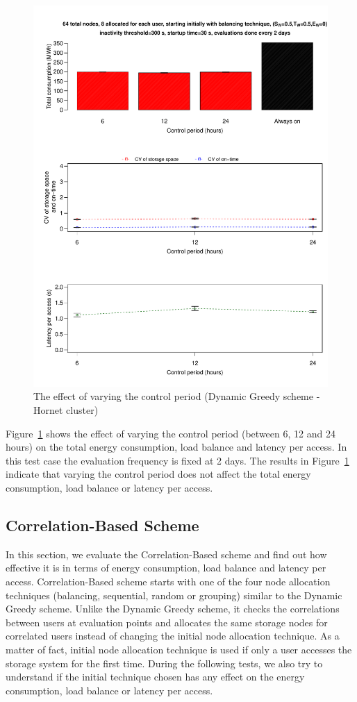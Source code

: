 \begin{figure}[!htbp]
\centering
\includegraphics[width=\columnwidth,keepaspectratio]{FIG11.pdf}
\caption{The effect of varying the control period (Dynamic Greedy scheme - Hornet cluster)}
\label{sixthresult}
\end{figure}

Figure~\ref{sixthresult} shows the effect of varying the control period (between 6, 12 and 24 hours)
on the total energy consumption, load balance and latency per access. In this test case the evaluation
frequency is fixed at 2 days. The results in Figure~\ref{sixthresult} indicate that varying the control
period does not affect the total energy consumption, load balance or latency per access.

\subsection{Correlation-Based Scheme}
In this section, we evaluate the Correlation-Based scheme and find out how effective it is in terms of energy consumption,
load balance and latency per access. Correlation-Based scheme starts with one of the four node allocation
techniques (balancing, sequential, random or grouping) similar to the Dynamic Greedy scheme. Unlike the Dynamic
Greedy scheme, it checks the correlations between users at evaluation points and allocates the same storage
nodes for correlated users instead of changing the initial node allocation technique. As a matter of fact,
initial node allocation technique is used if only a user accesses the storage system for the first time.
During the following tests, we also try to understand if the initial technique chosen has any effect on the
energy consumption, load balance or latency per access.

